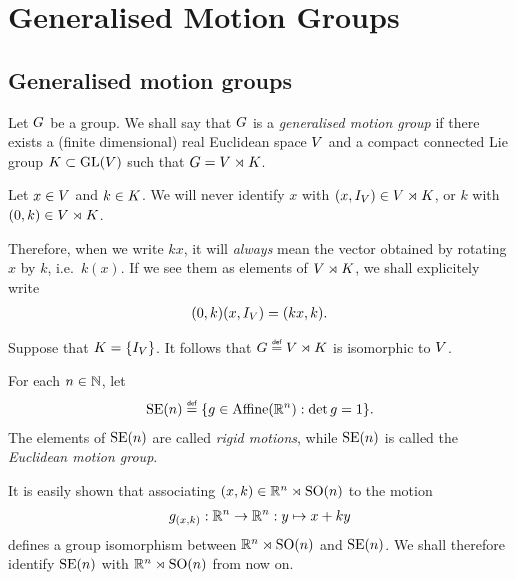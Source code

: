 \chapter{Generalised Motion Groups}

\section{Generalised motion groups}

\begin{definition}
\label{definition:generalised_motion_group}
    Let $G$ be a group.
    We shall say that $G$ is a \emph{generalised motion group}
    if there exists a (finite dimensional) real Euclidean space $V$
    and a compact connected Lie group $K \subset \mathrm{GL}(V)$
    such that $G = V \rtimes K$.
\end{definition}

\begin{remark}
    Let $x \in V$ and $k \in K$.
    We will never identify $x$ with $(x, {I_{V}}) \in V \rtimes K$,
    or $k$ with $(0, k) \in V \rtimes K$.

    Therefore, when we write $k x$, it will \emph{always} mean the vector obtained by rotating $x$ by $k$, i.e.\ $k(x)$.
    If we see them as elements of $V \rtimes K$,
    we shall explicitely write
    \begin{align*}
        (0, k) (x, {I_{V}}) = (k x, k).
    \end{align*}
\end{remark}

\begin{example}
\label{example:trivial_case_of_generalised_motion_groups}
    Suppose that $K = \{{I_{V}}\}$.
    It follows that $\Group \defeq \VectorSpace \rtimes \CompactGroup$ is isomorphic to $V$.
\end{example}

\begin{example}
\label{example:Euclidean_motion_groups}
    For each $n \in \mathbb{N}$, let
    \begin{align*}
        \MotionGroup{n} \defeq \{g \in \AffineTransformations{\R^n} : \det g = 1\}.
    \end{align*}
    The elements of ${\mathrm{SE} (n)}$ are called \emph{rigid motions},
    while ${\mathrm{SE} (n)}$ is called the \emph{Euclidean motion group}.

    It is easily shown that associating $(x, k) \in \mathbb{R}^n \rtimes {\mathrm{SO} (n)}$ to the motion
    \begin{align*}
        g_{(x, k)} : \mathbb{R}^n \to \mathbb{R}^n : y \mapsto x + ky
    \end{align*}
    defines a group isomorphism between $\mathbb{R}^n \rtimes {\mathrm{SO} (n)}$ and ${\mathrm{SE} (n)}$.
    We shall therefore identify ${\mathrm{SE} (n)}$ with $\mathbb{R}^n \rtimes {\mathrm{SO} (n)}$ from now on.
\end{example}

